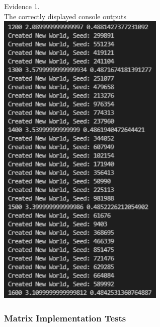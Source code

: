 \begin{center}
    {\large Evidence 1.\rn } \\ 
    \vspace{0.3cm}
    The correctly displayed console outputs \\
    \includegraphics[width=8cm]{Images/Testing/T1.10.1.PNG} \\
\end{center}

\subsubsection{Matrix Implementation Tests}

